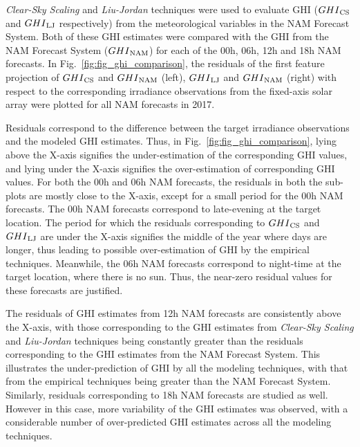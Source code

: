 \par \textit{Clear-Sky Scaling} and \textit{Liu-Jordan} techniques were used to evaluate GHI ($GHI\textsubscript{CS}$ and $GHI\textsubscript{LJ}$ respectively) from the meteorological variables in the NAM Forecast System. Both of these GHI estimates were compared with the GHI from the NAM Forecast System ($GHI\textsubscript{NAM}$) for each of the 00h, 06h, 12h and 18h NAM forecasts. In Fig.~\ref{fig:fig_ghi_comparison}, the residuals of the first feature projection of $GHI\textsubscript{CS}$ and $GHI\textsubscript{NAM}$ (left), $GHI\textsubscript{LJ}$ and $GHI\textsubscript{NAM}$ (right) with respect to the corresponding irradiance observations from the fixed-axis solar array were plotted for all NAM forecasts in 2017. 

\par Residuals correspond to the difference between the target irradiance observations and the modeled GHI estimates. Thus, in Fig.~\ref{fig:fig_ghi_comparison}, lying above the X-axis signifies the under-estimation of the corresponding GHI values, and lying under the X-axis signifies the over-estimation of corresponding GHI values. For both the 00h and 06h NAM forecasts, the residuals in both the sub-plots are mostly close to the X-axis, except for a small period for the 00h NAM forecasts. The 00h NAM forecasts correspond to late-evening at the target location. The period for which the residuals corresponding to $GHI\textsubscript{CS}$ and $GHI\textsubscript{LJ}$ are under the X-axis signifies the middle of the year where days are longer, thus leading to possible over-estimation of GHI by the empirical techniques. Meanwhile, the 06h NAM forecasts correspond to night-time at the target location, where there is no sun. Thus, the near-zero residual values for these forecasts are justified. 

\par The residuals of GHI estimates from 12h NAM forecasts are consistently above the X-axis, with those corresponding to the GHI estimates from \textit{Clear-Sky Scaling} and \textit{Liu-Jordan} techniques being constantly greater than the residuals corresponding to the GHI estimates from the NAM Forecast System. This illustrates the under-prediction of GHI by all the modeling techniques, with that from the empirical techniques being greater than the NAM Forecast System. Similarly, residuals corresponding to 18h NAM forecasts are studied as well. However in this case, more variability of the GHI estimates was observed, with a considerable number of over-predicted GHI estimates across all the modeling techniques. 


